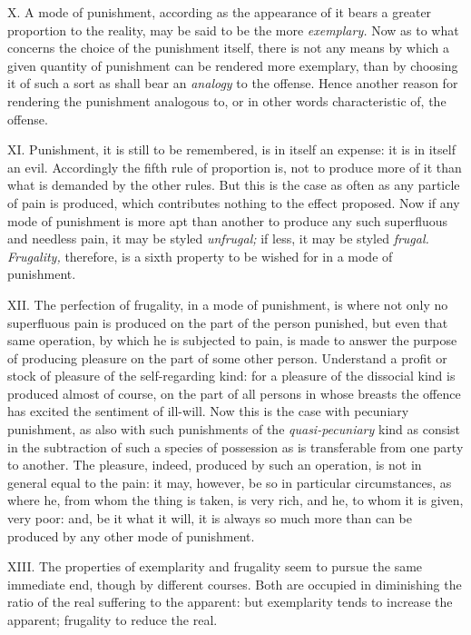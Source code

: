 \documentclass[12pt]{report}
\begin{document}
X. A mode of punishment, according as the appearance of it bears a
greater proportion to the reality, may be said to be the more
\emph{exemplary.} Now as to what concerns the choice of the punishment
itself, there is not any means by which a given quantity of punishment
can be rendered more exemplary, than by choosing it of such a sort as
shall bear an \emph{analogy} to the offense. Hence another reason for
rendering the punishment analogous to, or in other words characteristic
of, the offense.

XI. Punishment, it is still to be remembered, is in itself an expense:
it is in itself an evil. Accordingly the fifth rule of proportion is,
not to produce more of it than what is demanded by the other rules. But
this is the case as often as any particle of pain is produced, which
contributes nothing to the effect proposed. Now if any mode of
punishment is more apt than another to produce any such superfluous and
needless pain, it may be styled \emph{unfrugal;} if less, it may be
styled \emph{frugal. Frugality,} therefore, is a sixth property to be
wished for in a mode of punishment.

XII. The perfection of frugality, in a mode of punishment, is where not
only no superfluous pain is produced on the part of the person punished,
but even that same operation, by which he is subjected to pain, is made
to answer the purpose of producing pleasure on the part of some other
person. Understand a profit or stock of pleasure of the self-regarding
kind: for a pleasure of the dissocial kind is produced almost of course,
on the part of all persons in whose breasts the offence has excited the
sentiment of ill-will. Now this is the case with pecuniary punishment,
as also with such punishments of the \emph{quasi-pecuniary} kind as
consist in the subtraction of such a species of possession as is
transferable from one party to another. The pleasure, indeed, produced
by such an operation, is not in general equal to the pain: it may,
however, be so in particular circumstances, as where he, from whom the
thing is taken, is very rich, and he, to whom it is given, very poor:
and, be it what it will, it is always so much more than can be produced
by any other mode of punishment.

XIII. The properties of exemplarity and frugality seem to pursue the
same immediate end, though by different courses. Both are occupied in
diminishing the ratio of the real suffering to the apparent: but
exemplarity tends to increase the apparent; frugality to reduce the
real.
\end{document}
